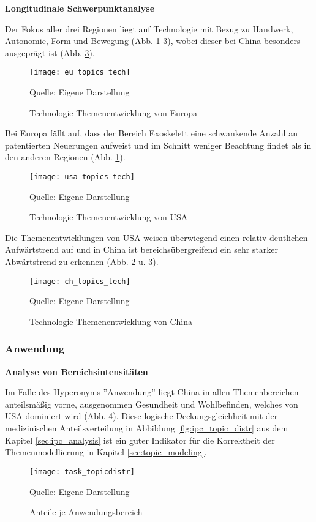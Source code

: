 \textbf{Longitudinale Schwerpunktanalyse}

Der Fokus aller drei Regionen liegt auf Technologie mit Bezug zu Handwerk, Autonomie, Form und Bewegung (Abb. \ref{fig:eu_topics_tech}-\ref{fig:ch_topics_tech}), wobei dieser bei China besonders ausgeprägt ist (Abb. \ref{fig:ch_topics_tech}).
\begin{figure}[h]
	\caption{Technologie-Themenentwicklung von Europa}
	\texttt{[image: eu\_topics\_tech]}
	\label{fig:eu_topics_tech}
	\vspace{0.5em}
	\raggedright
	\normalsize{Quelle: Eigene Darstellung}
\end{figure}
Bei Europa fällt auf, dass der Bereich Exoskelett eine schwankende Anzahl an patentierten Neuerungen aufweist und im Schnitt weniger Beachtung findet als in den anderen Regionen (Abb. \ref{fig:eu_topics_tech}).
\begin{figure}[h]
	\caption{Technologie-Themenentwicklung von USA}
	\texttt{[image: usa\_topics\_tech]}
	\label{fig:usa_topics_tech}
	\vspace{0.5em}
	\raggedright
	\normalsize{Quelle: Eigene Darstellung}
	\vspace{-1.0em}
\end{figure}
Die Themenentwicklungen von USA weisen überwiegend einen relativ deutlichen Aufwärtstrend auf und in China ist bereichsübergreifend ein sehr starker Abwärtstrend zu erkennen (Abb. \ref{fig:usa_topics_tech} u. \ref{fig:ch_topics_tech}).
\begin{figure}[H]
	\caption{Technologie-Themenentwicklung von China}
	\texttt{[image: ch\_topics\_tech]}
	\label{fig:ch_topics_tech}
	\vspace{0.5em}
	\raggedright
	\normalsize{Quelle: Eigene Darstellung}
	\vspace{-1.0em}
\end{figure}


\subsubsection{Anwendung}

\textbf{Analyse von Bereichsintensitäten}

Im Falle des Hyperonyms ''Anwendung'' liegt China in allen Themenbereichen anteilsmäßig vorne, ausgenommen Gesundheit und Wohlbefinden, welches von USA dominiert wird (Abb. \ref{fig:task_topicdistr}). Diese logische Deckungsgleichheit mit der medizinischen Anteilsverteilung in Abbildung \ref{fig:ipc_topic_distr} aus dem Kapitel \ref{sec:ipc_analysis} ist ein guter Indikator für die Korrektheit der Themenmodellierung in Kapitel \ref{sec:topic_modeling}.
\begin{figure}[H]
	\caption{Anteile je Anwendungsbereich}
	\texttt{[image: task\_topicdistr]}
	\label{fig:task_topicdistr}
	\vspace{0.5em}
	\raggedright
	\normalsize{Quelle: Eigene Darstellung}
	\vspace{-2.0em}
\end{figure}

